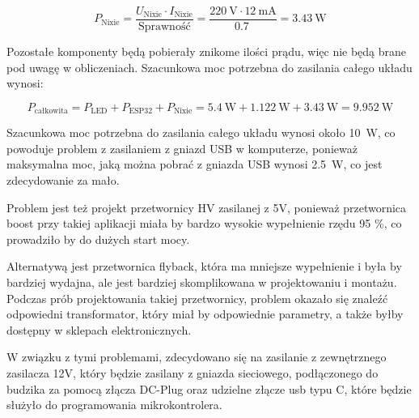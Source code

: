 \documentclass{article}
\begin{document}
\begin{equation}
    P_{\text{Nixie}} = \frac{U_{\text{Nixie}} \cdot I_{\text{Nixie}}}{\text{Sprawność}} = \frac{\SI{220}{\volt} \cdot \SI{12}{\milli\ampere}}{\SI{0.7}{}} = \SI{3.43}{\watt}
\end{equation}

Pozostałe komponenty będą pobierały znikome ilości prądu, więc nie będą brane pod uwagę w obliczeniach.
Szacunkowa moc potrzebna do zasilania całego układu wynosi:

\begin{equation}
    P_{\text{całkowita}} = P_{\text{LED}} + P_{\text{ESP32}} + P_{\text{Nixie}} = \SI{5.4}{\watt} + \SI{1.122}{\watt} + \SI{3.43}{\watt} = \SI{9.952}{\watt}
\end{equation}

Szacunkowa moc potrzebna do zasilania całego układu wynosi około \SI{10}{\watt}, co powoduje problem z zasilaniem z gniazd USB w komputerze,
ponieważ maksymalna moc, jaką można pobrać z gniazda USB wynosi \SI{2.5}{\watt}, co jest zdecydowanie za mało.

Problem jest też projekt przetwornicy HV zasilanej z 5V, ponieważ przetwornica boost przy takiej aplikacji miała by bardzo wysokie wypełnienie rzędu 95 \%,
co prowadziło by do dużych start mocy.

Alternatywą jest przetwornica flyback, która ma mniejsze wypełnienie i była by bardziej wydajna, ale jest bardziej skomplikowana w projektowaniu i montażu.
Podczas prób projektowania takiej przetwornicy, problem okazało się znaleźć odpowiedni transformator, który miał by odpowiednie parametry,
a także byłby dostępny w sklepach elektronicznych.

W związku z tymi problemami, zdecydowano się na zasilanie z zewnętrznego zasilacza 12V, który będzie zasilany z gniazda sieciowego, 
podłączonego do budzika za pomocą złącza DC-Plug oraz udzielne złącze usb typu C, które będzie służyło do programowania mikrokontrolera.
\end{document}
